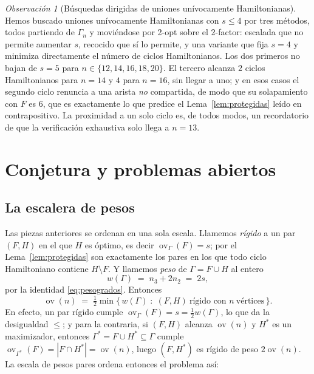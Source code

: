 \documentclass[11pt,a4paper]{article}
\theoremstyle{definition}
\theoremstyle{remark}
\newtheorem{observacion}[teorema]{Observación}
\newcommand{\ov}{\operatorname{ov}}
\begin{document}
\begin{observacion}[Búsquedas dirigidas de uniones unívocamente Hamiltonianas]\label{obs:busquedaUH}
Hemos buscado uniones unívocamente Hamiltonianas con $s\le4$ por tres métodos, todos partiendo de $\Gamma_n$ y moviéndose por 2-opt sobre el 2-factor: escalada que no permite aumentar $s$, recocido que sí lo permite, y una variante que fija $s=4$ y minimiza directamente el número de ciclos Hamiltonianos. Los dos primeros no bajan de $s=5$ para $n\in\{12,14,16,18,20\}$. El tercero alcanza $2$ ciclos Hamiltonianos para $n=14$ y $4$ para $n=16$, sin llegar a uno; y en esos casos el segundo ciclo renuncia a una arista \emph{no} compartida, de modo que su solapamiento con $F$ es $6$, que es exactamente lo que predice el Lema~\ref{lem:protegidas} leído en contrapositivo. La proximidad a un solo ciclo es, de todos modos, un recordatorio de que la verificación exhaustiva solo llega a $n=13$.
\end{observacion}


\section{Conjetura y problemas abiertos}\label{sec:abiertos}

\subsection{La escalera de pesos}\label{sub:escalera}

Las piezas anteriores se ordenan en una sola escala. Llamemos \emph{rígido} a un par $(F,H)$ en el que $H$ es óptimo, es decir $\ov_\Gamma(F)=s$; por el Lema~\ref{lem:protegidas} son exactamente los pares en los que todo ciclo Hamiltoniano contiene $H\setminus F$. Y llamemos \emph{peso} de $\Gamma=F\cup H$ al entero
\[
w(\Gamma)\;=\;n_3+2n_2\;=\;2s ,
\]
por la identidad \eqref{eq:pesogrados}. Entonces
\[
\ov(n)\;=\;\tfrac12\min\{\,w(\Gamma)\;:\;(F,H)\ \text{rígido con }n\ \text{vértices}\,\}.
\]
En efecto, un par rígido cumple $\ov_\Gamma(F)=s=\tfrac12w(\Gamma)$, lo que da la desigualdad $\le$; y para la contraria, si $(F,H)$ alcanza $\ov(n)$ y $H^*$ es un maximizador, entonces $\Gamma^*=F\cup H^*\subseteq\Gamma$ cumple $\ov_{\Gamma^*}(F)=|F\cap H^*|=\ov(n)$, luego $(F,H^*)$ es rígido de peso $2\ov(n)$. La escala de pesos pares ordena entonces el problema así:
\end{document}
